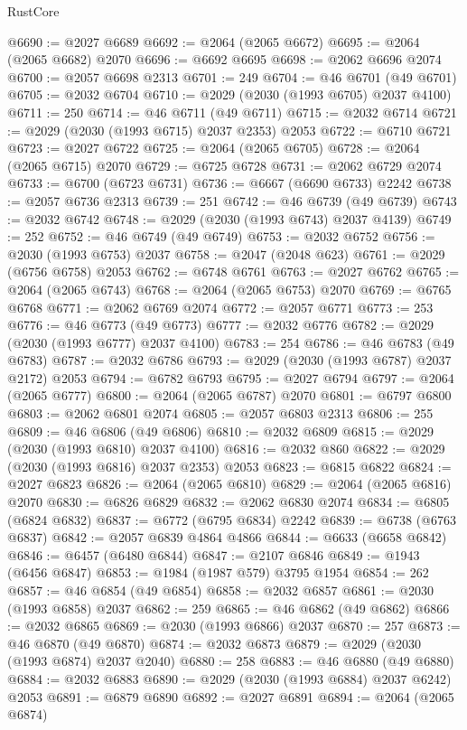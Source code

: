 \begin{lexlean}{RustCore}
\begin{coremodule}
@6690 := @2027 @6689
@6692 := @2064 (@2065 @6672)
@6695 := @2064 (@2065 @6682) @2070
@6696 := @6692 @6695
@6698 := @2062 @6696 @2074
@6700 := @2057 @6698 @2313
@6701 := 249
@6704 := @46 @6701 (@49 @6701)
@6705 := @2032 @6704
@6710 := @2029 (@2030 (@1993 @6705) @2037 @4100)
@6711 := 250
@6714 := @46 @6711 (@49 @6711)
@6715 := @2032 @6714
@6721 := @2029 (@2030 (@1993 @6715) @2037 @2353) @2053
@6722 := @6710 @6721
@6723 := @2027 @6722
@6725 := @2064 (@2065 @6705)
@6728 := @2064 (@2065 @6715) @2070
@6729 := @6725 @6728
@6731 := @2062 @6729 @2074
@6733 := @6700 (@6723 @6731)
@6736 := @6667 (@6690 @6733) @2242
@6738 := @2057 @6736 @2313
@6739 := 251
@6742 := @46 @6739 (@49 @6739)
@6743 := @2032 @6742
@6748 := @2029 (@2030 (@1993 @6743) @2037 @4139)
@6749 := 252
@6752 := @46 @6749 (@49 @6749)
@6753 := @2032 @6752
@6756 := @2030 (@1993 @6753) @2037
@6758 := @2047 (@2048 @623)
@6761 := @2029 (@6756 @6758) @2053
@6762 := @6748 @6761
@6763 := @2027 @6762
@6765 := @2064 (@2065 @6743)
@6768 := @2064 (@2065 @6753) @2070
@6769 := @6765 @6768
@6771 := @2062 @6769 @2074
@6772 := @2057 @6771
@6773 := 253
@6776 := @46 @6773 (@49 @6773)
@6777 := @2032 @6776
@6782 := @2029 (@2030 (@1993 @6777) @2037 @4100)
@6783 := 254
@6786 := @46 @6783 (@49 @6783)
@6787 := @2032 @6786
@6793 := @2029 (@2030 (@1993 @6787) @2037 @2172) @2053
@6794 := @6782 @6793
@6795 := @2027 @6794
@6797 := @2064 (@2065 @6777)
@6800 := @2064 (@2065 @6787) @2070
@6801 := @6797 @6800
@6803 := @2062 @6801 @2074
@6805 := @2057 @6803 @2313
@6806 := 255
@6809 := @46 @6806 (@49 @6806)
@6810 := @2032 @6809
@6815 := @2029 (@2030 (@1993 @6810) @2037 @4100)
@6816 := @2032 @860
@6822 := @2029 (@2030 (@1993 @6816) @2037 @2353) @2053
@6823 := @6815 @6822
@6824 := @2027 @6823
@6826 := @2064 (@2065 @6810)
@6829 := @2064 (@2065 @6816) @2070
@6830 := @6826 @6829
@6832 := @2062 @6830 @2074
@6834 := @6805 (@6824 @6832)
@6837 := @6772 (@6795 @6834) @2242
@6839 := @6738 (@6763 @6837)
@6842 := @2057 @6839 @4864 @4866
@6844 := @6633 (@6658 @6842)
@6846 := @6457 (@6480 @6844)
@6847 := @2107 @6846
@6849 := @1943 (@6456 @6847)
@6853 := @1984 (@1987 @579) @3795 @1954
@6854 := 262
@6857 := @46 @6854 (@49 @6854)
@6858 := @2032 @6857
@6861 := @2030 (@1993 @6858) @2037
@6862 := 259
@6865 := @46 @6862 (@49 @6862)
@6866 := @2032 @6865
@6869 := @2030 (@1993 @6866) @2037
@6870 := 257
@6873 := @46 @6870 (@49 @6870)
@6874 := @2032 @6873
@6879 := @2029 (@2030 (@1993 @6874) @2037 @2040)
@6880 := 258
@6883 := @46 @6880 (@49 @6880)
@6884 := @2032 @6883
@6890 := @2029 (@2030 (@1993 @6884) @2037 @6242) @2053
@6891 := @6879 @6890
@6892 := @2027 @6891
@6894 := @2064 (@2065 @6874)

\end{coremodule}
\end{lexlean}
